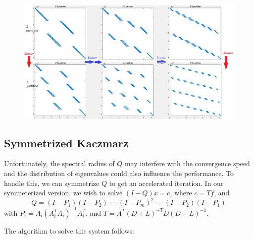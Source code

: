 \documentclass[a4paper,12pt]{article}
\begin{document}
\begin{figure}[ht]
\begin{centering}
\includegraphics[width=7in]{Images/quality.jpg}
\end{centering}
\label{fig:quality}
\end{figure}




\subsection{Symmetrized Kaczmarz}
Unfortunately, the spectral radius of $Q$ may interfere with the convergence speed and the distribution of eigenvalues could also influence the performance. To handle this, we can symmetrize $Q$ to get an accelerated iteration. In our symmeterized version, we wish to solve $(I-Q)x = c$, where $c = Tf$, and $$Q=(I-P_{1})(I-P_{2})\cdot\cdot\cdot(I-P_{m})^{2}\cdot\cdot\cdot(I-P_{2})(I-P_{1})$$
 with $P_{i}=A_{i}(A_{i}^{T}A_{i})^{-1}A_{i}^{T}$, and  $T=A^{T}(D+L)^{-T}D(D+L)^{-1}$.

The algorithm to solve this system follows:
\end{document}
